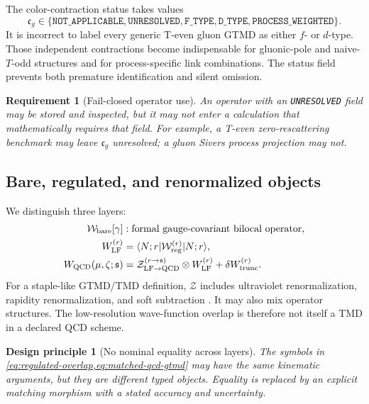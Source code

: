 \documentclass[11pt]{article}
\newtheorem{principle}[definition]{Design principle}
\newtheorem{requirement}[definition]{Requirement}
\newcommand{\LF}{\mathrm{LF}}
\newcommand{\cW}{\mathcal W}
\newcommand{\cZ}{\mathcal Z}
\begin{document}
The color-contraction status takes values
\begin{equation}
 \mathfrak c_g\in
 \{\texttt{NOT\_APPLICABLE},
   \texttt{UNRESOLVED},
   \texttt{F\_TYPE},
   \texttt{D\_TYPE},
   \texttt{PROCESS\_WEIGHTED}\}.
\label{eq:gluon-color-status}
\end{equation}
It is incorrect to label every generic T-even gluon GTMD as either
\(f\)- or \(d\)-type.  Those independent contractions become indispensable
for gluonic-pole and naive-\(T\)-odd structures and for process-specific link
combinations.  The status field prevents both premature identification and
silent omission.

\begin{requirement}[Fail-closed operator use]
\label{req:fail-closed-operator}
An operator with an \texttt{UNRESOLVED} field may be stored and inspected,
but it may not enter a calculation that mathematically requires that field.
For example, a T-even zero-rescattering benchmark may leave
\(\mathfrak c_g\) unresolved; a gluon Sivers process projection may not.
\end{requirement}

\subsection{Bare, regulated, and renormalized objects}

We distinguish three layers:
\begin{align}
 \cW_{\rm bare}[\gamma]
 &:\text{formal gauge-covariant bilocal operator},
\label{eq:bare-operator}\\
 W_{\LF}^{(r)}
 &=\langle N;r|\cW_{\rm reg}^{(r)}|N;r\rangle,
\label{eq:regulated-overlap}\\
 W_{\rm QCD}(\mu,\zeta;\mathfrak s)
 &=\cZ_{\LF\to\rm QCD}^{(r\to\mathfrak s)}
 \otimes W_{\LF}^{(r)}
 +\delta W_{\rm trunc}^{(r)}.
\label{eq:matched-qcd-gtmd}
\end{align}
For a staple-like GTMD/TMD definition, \(\cZ\) includes ultraviolet
renormalization, rapidity renormalization, and soft subtraction
\cite{Collins2011,Echevarria2016}.  It may also
mix operator structures.  The low-resolution wave-function overlap is
therefore not itself a TMD in a declared QCD scheme.

\begin{principle}[No nominal equality across layers]
\label{prin:no-nominal-equality}
The symbols in \cref{eq:regulated-overlap,eq:matched-qcd-gtmd} may have the
same kinematic arguments, but they are different typed objects.  Equality is
replaced by an explicit matching morphism with a stated accuracy and
uncertainty.
\end{principle}
\end{document}
